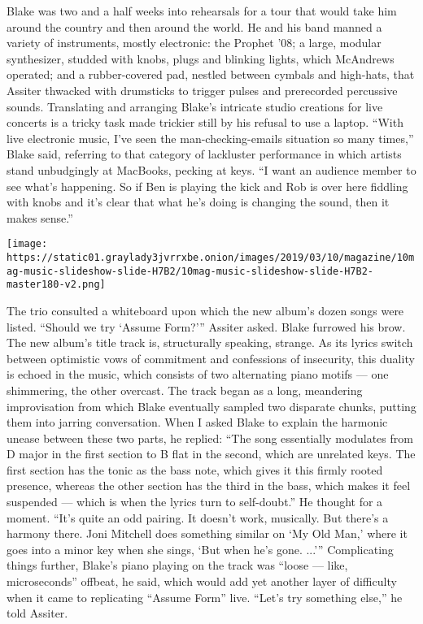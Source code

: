 Blake was two and a half weeks into rehearsals for a tour that would
take him around the country and then around the world. He and his band
manned a variety of instruments, mostly electronic: the Prophet '08; a
large, modular synthesizer, studded with knobs, plugs and blinking
lights, which McAndrews operated; and a rubber-covered pad, nestled
between cymbals and high-hats, that Assiter thwacked with drumsticks to
trigger pulses and prerecorded percussive sounds. Translating and
arranging Blake's intricate studio creations for live concerts is a
tricky task made trickier still by his refusal to use a laptop. ``With
live electronic music, I've seen the man-checking-emails situation so
many times,'' Blake said, referring to that category of lackluster
performance in which artists stand unbudgingly at MacBooks, pecking at
keys. ``I want an audience member to see what's happening. So if Ben is
playing the kick and Rob is over here fiddling with knobs and it's clear
that what he's doing is changing the sound, then it makes sense.''

\texttt{[image: https://static01.graylady3jvrrxbe.onion/images/2019/03/10/magazine/10mag-music-slideshow-slide-H7B2/10mag-music-slideshow-slide-H7B2-master180-v2.png]}

The trio consulted a whiteboard upon which the new album's dozen songs
were listed. ``Should we try `Assume Form?''' Assiter asked. Blake
furrowed his brow. The new album's title track is, structurally
speaking, strange. As its lyrics switch between optimistic vows of
commitment and confessions of insecurity, this duality is echoed in the
music, which consists of two alternating piano motifs --- one
shimmering, the other overcast. The track began as a long, meandering
improvisation from which Blake eventually sampled two disparate chunks,
putting them into jarring conversation. When I asked Blake to explain
the harmonic unease between these two parts, he replied: ``The song
essentially modulates from D major in the first section to B flat in the
second, which are unrelated keys. The first section has the tonic as the
bass note, which gives it this firmly rooted presence, whereas the other
section has the third in the bass, which makes it feel suspended ---
which is when the lyrics turn to self-doubt.'' He thought for a moment.
``It's quite an odd pairing. It doesn't work, musically. But there's a
harmony there. Joni Mitchell does something similar on `My Old Man,'
where it goes into a minor key when she sings, `But when he's gone.
...''' Complicating things further, Blake's piano playing on the track
was ``loose --- like, microseconds'' offbeat, he said, which would add
yet another layer of difficulty when it came to replicating ``Assume
Form'' live. ``Let's try something else,'' he told Assiter.

